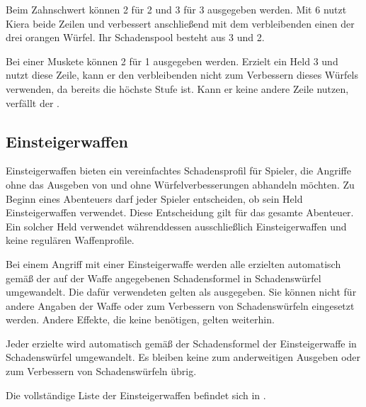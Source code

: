 \begin{beispiel}[title=Beispiel: Mehrere Zeilen nutzen und Würfel verbessern]
Beim Zahnschwert können 2\star{} für 2\redDmgDie{} und 3\star{} für 3\orangeDmgDie{} ausgegeben werden. Mit 6\star{} nutzt Kiera beide Zeilen und verbessert anschließend mit dem verbleibenden \star{} einen der drei orangen Würfel. Ihr Schadenspool besteht aus 3\redDmgDie{} und 2\orangeDmgDie{}.
\end{beispiel}

\begin{beispiel}[title=Beispiel: Schwarze Schadenswürfel]
Bei einer Muskete können 2\star{} für 1\blackDmgDie{} ausgegeben werden. Erzielt ein Held 3\star{} und nutzt diese Zeile, kann er den verbleibenden \star{} nicht zum Verbessern dieses Würfels verwenden, da \blackDmgDie{} bereits die höchste Stufe ist. Kann er keine andere Zeile nutzen, verfällt der \star{}.
\end{beispiel}

\subsection{Einsteigerwaffen}

Einsteigerwaffen bieten ein vereinfachtes Schadensprofil für Spieler, die Angriffe ohne das Ausgeben von \star{} und ohne Würfelverbesserungen abhandeln möchten. Zu Beginn eines Abenteuers darf jeder Spieler entscheiden, ob sein Held Einsteigerwaffen verwendet. Diese Entscheidung gilt für das gesamte Abenteuer. Ein solcher Held verwendet währenddessen ausschließlich Einsteigerwaffen und keine regulären Waffenprofile.

Bei einem Angriff mit einer Einsteigerwaffe werden alle erzielten \star{} automatisch gemäß der auf der Waffe angegebenen Schadensformel in Schadenswürfel umgewandelt. Die dafür verwendeten \star{} gelten als ausgegeben. Sie können nicht für andere Angaben der Waffe oder zum Verbessern von Schadenswürfeln eingesetzt werden. Andere Effekte, die keine \star{} benötigen, gelten weiterhin.

\begin{kurzregel}[title=Einfaches Schadensprofil]
Jeder erzielte \star{} wird automatisch gemäß der Schadensformel der Einsteigerwaffe in Schadenswürfel umgewandelt. Es bleiben keine \star{} zum anderweitigen Ausgeben oder zum Verbessern von Schadenswürfeln übrig.
\end{kurzregel}

Die vollständige Liste der Einsteigerwaffen befindet sich in .

